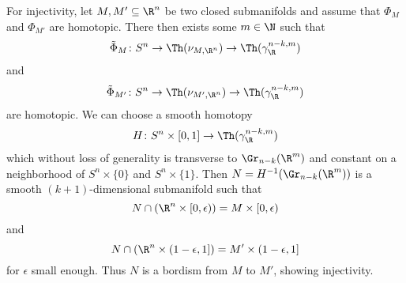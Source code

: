 For injectivity, let $M, M' \subseteq \R^n$ be two closed submanifolds and assume that $\Phi_M$ and $\Phi_{M'}$ are homotopic.
There then exists some $m \in \N$ such that
\begin{equation*}
	\tilde{\Phi}_M\colon S^n \to \Th(\nu_{M, \R^n}) \to \Th(\gamma_\R^{n - k, m})
\end{equation*}
and
\begin{equation*}
	\tilde{\Phi}_{M'}\colon S^n \to \Th(\nu_{M', \R^n}) \to \Th(\gamma_\R^{n - k, m})
\end{equation*}
are homotopic.
We can choose a smooth homotopy
\begin{equation*}
	H\colon S^n \times [0, 1] \to \Th(\gamma_\R^{n - k, m})
\end{equation*}
which without loss of generality is transverse to $\Gr_{n - k}(\R^m)$ and constant on a neighborhood of $S^n \times \{0\}$ and $S^n \times \{1\}$.
Then $N = H^{-1}(\Gr_{n - k}(\R^m))$ is a smooth $(k + 1)$-dimensional submanifold such that 
\begin{equation*}
	N \cap (\R^n \times [0, \epsilon)) = M \times [0, \epsilon)
\end{equation*}
and
\begin{equation*}
	N \cap (\R^n \times (1 - \epsilon, 1]) = M' \times (1 - \epsilon, 1]
\end{equation*}
for $\epsilon$ small enough.
Thus $N$ is a bordism from $M$ to $M'$, showing injectivity.

